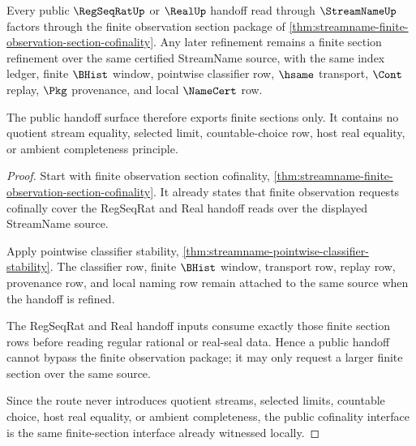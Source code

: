\begin{theorem}
\label{thm:streamname-finite-observation-section-public-cofinality}
Every public $\RegSeqRatUp$ or $\RealUp$ handoff read through $\StreamNameUp$ factors through the finite observation section package of \autoref{thm:streamname-finite-observation-section-cofinality}. Any later refinement remains a finite section refinement over the same certified StreamName source, with the same index ledger, finite $\BHist$ window, pointwise classifier row, $\hsame$ transport, $\Cont$ replay, $\Pkg$ provenance, and local $\NameCert$ row.

The public handoff surface therefore exports finite sections only. It contains no quotient stream equality, selected limit, countable-choice row, host real equality, or ambient completeness principle.
\end{theorem}
\begin{proof}
Start with finite observation section cofinality, \autoref{thm:streamname-finite-observation-section-cofinality}. It already states that finite observation requests cofinally cover the RegSeqRat and Real handoff reads over the displayed StreamName source.

Apply pointwise classifier stability, \autoref{thm:streamname-pointwise-classifier-stability}. The classifier row, finite $\BHist$ window, transport row, replay row, provenance row, and local naming row remain attached to the same source when the handoff is refined.

The RegSeqRat and Real handoff inputs consume exactly those finite section rows before reading regular rational or real-seal data. Hence a public handoff cannot bypass the finite observation package; it may only request a larger finite section over the same source.

Since the route never introduces quotient streams, selected limits, countable choice, host real equality, or ambient completeness, the public cofinality interface is the same finite-section interface already witnessed locally.
\end{proof}

